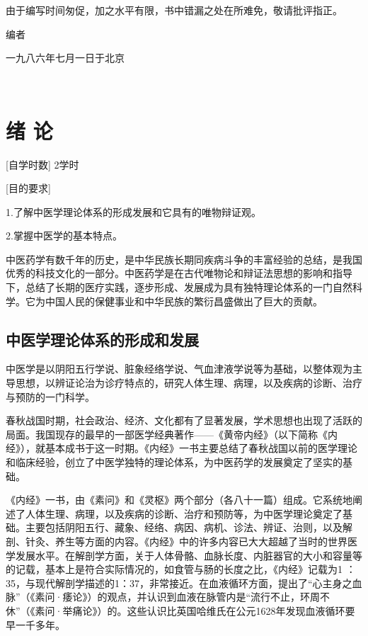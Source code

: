 \documentclass[a4paper,12pt,UTF8,twoside]{ctexbook}
\begin{document}
由于编写时间匆促，加之水平有限，书中错漏之处在所难免，敬请批评指正。

编者

一九八六年七月一日于北京



\mainmatter

~\\

 \qquad  

\chapter{绪 论}

[自学时数] 2学时

[目的要求]

1.了解中医学理论体系的形成发展和它具有的唯物辩证观。

2.掌握中医学的基本特点。

中医药学有数千年的历史，是中华民族长期同疾病斗争的丰富经验的总结，是我国优秀的科技文化的一部分。中医药学是在古代唯物论和辩证法思想的影响和指导下，总结了长期的医疗实践，逐步形成、发展成为具有独特理论体系的一门自然科学。它为中国人民的保健事业和中华民族的繁衍昌盛做出了巨大的贡献。

\section{中医学理论体系的形成和发展}

中医学是以阴阳五行学说、脏象经络学说、气血津液学说等为基础，以整体观为主导思想，以辨证论治为诊疗特点的，研究人体生理、病理，以及疾病的诊断、治疗与预防的一门科学。

春秋战国时期，社会政治、经济、文化都有了显著发展，学术思想也出现了活跃的局面。我国现存的最早的一部医学经典著作——《黄帝内经》（以下简称《内经》），就基本成书于这一时期。《内经》一书主要总结了春秋战国以前的医学理论和临床经验，创立了中医学独特的理论体系，为中医药学的发展奠定了坚实的基础。

《内经》一书，由《素问》和《灵枢》两个部分（各八十一篇）组成。它系统地阐述了人体生理、病理，以及疾病的诊断、治疗和预防等，为中医学理论奠定了基础。主要包括阴阳五行、藏象、经络、病因、病机、诊法、辨证、治则，以及解剖、针灸、养生等方面的内容。《内经》中的许多内容已大大超越了当时的世界医学发展水平。在解剖学方面，关于人体骨骼、血脉长度、内脏器官的大小和容量等的记载，基本上是符合实际情况的，如食管与肠的长度之比，《内经》记载为1 ： 35，与现代解剖学描述的1：37，非常接近。在血液循环方面，提出了“心主身之血脉”（《素问·痿论》）的观点，并认识到血液在脉管内是“流行不止，环周不休”（《素问·举痛论》）的。这些认识比英国哈维氏在公元1628年发现血液循环要早一千多年。
\end{document}
